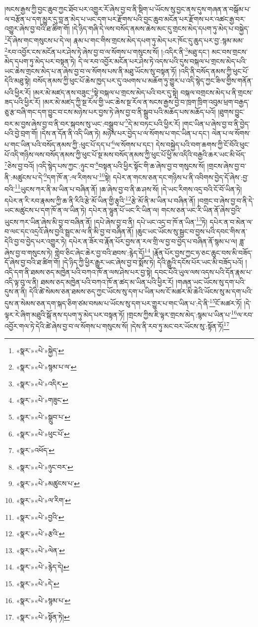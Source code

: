 །སངས་རྒྱས་ཀྱི་བྱང་ཆུབ་ཀྱང་ཐོབ་པར་འགྱུར་རོ་ཞེས་བྱ་བ་ནི་སྡིག་པ་ཡོངས་སུ་བྱང་ནས་དུས་གཞན་ན་བསྒོམ་པ་ལ་བརྩོན་པ་དག་མྱུར་དུ་བླ་ན་མེད་པ་ཡང་དག་པར་རྫོགས་པའི་བྱང་ཆུབ་མངོན་པར་རྫོགས་པར་འཚང་རྒྱ་བར་འགྱུར་ཞེས་བྱ་བའི་ཐ་ཚིག་གོ། །དེ་ཉིད་གཞི་དེ་ལས་བསོད་ནམས་ཆེས་མང་དུ་གྲངས་མེད་དཔག་ཏུ་མེད་པ་བསྐྱེད་\footnote{«སྣར་»«པེ་»སྐྱེད་}དོ་ཞེས་གང་གསུངས་པ་དེ་ལ། རྣམ་པ་གང་གིས་གྲངས་མེད་དཔག་ཏུ་མེད་པར་ཁོང་དུ་ཆུད་པར་བྱ་:སྙམ་མམ་\footnote{«སྣར་»«པེ་»སྙམ་པ་ལ་}རབ་འབྱོར་ངས་མངོན་པར་ཤེས་ཏེ་ཞེས་བྱ་བ་ལ་སོགས་པ་གསུངས་སོ། །:འདིར་ནི་\footnote{«སྣར་»«པེ་»འདིར་}མཐུ་དང་། མང་བས་གྲངས་མེད་དཔག་ཏུ་མེད་པར་བསྟན་ཏེ། དེ་ལ་རབ་འབྱོར་མངོན་པར་ཤེས་ཏེ་འདས་པའི་དུས་བསྐལ་པ་གྲངས་མེད་པའི་ཡང་ཆེས་གྲངས་མེད་པ་ན་ཞེས་བྱ་བ་ལ་སོགས་པས་ནི་མཐུ་ཡོངས་སུ་བསྟན་ཏོ། །འདི་ནི་བསོད་ནམས་ཀྱི་ཕུང་པོ་དེའི་མཐུ་སྟེ། བསོད་ནམས་ཀྱི་ཕུང་པོ་ཆེས་ཁྱད་པར་དུ་འཕགས་པ་མཆོག་ཏུ་གྱུར་པ་འདི་སྙེད་ཀྱང་ཟིལ་གྱིས་གནོན་པའི་ཕྱིར་རོ། །མར་མེ་མཛད་ནས་བཟུང་\footnote{«སྣར་»«པེ་»གཟུང་}སྟེ་བསྐལ་པ་གྲངས་མེད་པའི་བར་དུ་སྟེ། བསྐལ་བགྲངས་མེད་པ་ནི་གྲངས་ཟད་པའི་ཕྱིར་རོ། །མར་མེ་མཛད་ཀྱི་སྔ་རོལ་གྱི་ཡང་ཆེས་སྔ་རོལ་ན་སངས་རྒྱས་བྱེ་བ་ཁྲག་ཁྲིག་འབུམ་ཕྲག་བརྒྱད་ཅུ་རྩ་བཞི་གང་དག་བྱུང་བ་ངས་མཉེས་པར་བྱས་ཏེ་ཞེས་བྱ་བ་ནི་སྒྲུབ་པའི་མཆོད་པས་མཆོད་པའོ། །ཐུགས་བྱུང་བར་མ་བྱས་ཞེས་བྱ་བ་ནི་བར་སྐབས་སུ་ཡང་:བསྒྲུབ་པ་\footnote{«སྣར་»«པེ་»སྒྲུབ་པ་}དེ་མ་བཏང་པའི་ཕྱིར་རོ། །གང་ཡིན་པ་ཞེས་བྱ་བ་ནི་བྱེད་པའི་བྱེ་བྲག་གོ། །དེས་ན་དོན་ནི་འདི་ཡིན་ཏེ། མཉེས་པར་བྱེད་པ་ལ་སོགས་པ་གང་ཡིན་པ་དང་། ལེན་པ་ལ་སོགས་པ་གང་ཡིན་པའི་བསོད་ནམས་ཀྱི་:ཕུང་པོ་དད་པ་\footnote{«སྣར་»«པེ་»ཕུང་པོ་}ལ་སོགས་པ་དང་། དེས་བསྐྱེད་པའི་བག་ཆགས་ཀྱི་ངོ་བོའི་ཕུང་པོ་འདི་གཉིས་ལས་བསོད་ནམས་ཀྱི་ཕུང་པོ་སྔ་མས་བསོད་ནམས་ཀྱི་ཕུང་པོ་ཕྱི་མ་འདིའི་བརྒྱའི་ཆར་ཡང་མི་ཕོད་\footnote{«སྣར་»འཕོད་}ཅེས་བྱ་བའོ། །འདི་སྙེད་པས་ཀྱང་:ཉུང་བ་\footnote{«སྣར་»«པེ་»ཉུང་བར་}བསྟན་པའི་ཕྱིར་སྟོང་གི་ཆ་ཞེས་བྱ་བ་གསུངས་སོ། །གྲངས་ཞེས་བྱ་བ་ནི་:མཚུངས་པ་དེ་\footnote{«སྣར་»«པེ་»མཚུངས་པ་}དག་ཁོ་ན་:ལ་རིགས་པ་\footnote{«སྣར་»«པེ་»ལ་རིག་}སྟེ། དཔེར་ན་གངས་ཅན་དང་གཉིས་པ་ནི་འབིགས་བྱེད་དོ་ཞེས་:བྱ་བའི་\footnote{«སྣར་»«པེ་»བྱའི་}ཡུངས་ཀར་ནི་མ་ཡིན་པ་བཞིན་ནོ། །ཆ་ཞེས་བྱ་བ་ནི་ཆ་ཤས་སོ། །དེ་ཡང་རིགས་འདྲ་བའི་ངོ་བོ་ཡིན་ཏེ། དཔེར་ན་རི་རབ་རྣམས་ཀྱི་ཆ་ནི་རིའི་རྩེ་མོ་ཡིན་གྱི་རྩྭའི་\footnote{«སྣར་»«པེ་»རྩའི་}རྩེ་མོ་ནི་མ་ཡིན་པ་བཞིན་ནོ། །བགྲང་བ་ཞེས་བྱ་བ་ནི་དེ་ཡང་མཚུངས་པ་དག་ཁོ་ན་ལ་ཡིན་ཏེ། དཔེར་ན་ལྷུན་པོ་ཡང་རི་ཡིན་ལ། གངས་ཅན་ཡང་རི་ཡིན་ནོ་ཞེས་བྱའི་ཡུངས་ཀར་ཡིན་ཞེས་མི་བྱ་བ་བཞིན་ནོ། །དཔེ་ཞེས་བྱ་བ་ནི། དཔེ་ཡང་འདྲ་བ་ཁོ་ན་ཡིན་\footnote{«སྣར་»«པེ་»ལེན་}ཏེ། དཔེར་ན་བ་མེན་ལ་བ་ལང་དང་འདྲའོ་ཞེས་བྱའི་སྦྲང་མ་ལ་ནི་མི་བྱ་བ་བཞིན་ནོ། །ཆུང་ཡང་ཡོངས་སུ་སྦྱང་བ་བྱས་པའི་དབང་གིས་ན་དེའི་བྱ་བ་བྱེད་པར་འགྱུར་ཏེ། དཔེར་ན་ཟོར་བ་རྣོན་པོར་བྱས་ན་རལ་གྲི་ལ་བྱ་བ་བྱེད་པ་བཞིན་ནོ་སྙམ་པ་ལ། ཟླ་ཞེས་བྱ་བ་གསུངས་ཏེ། གླེབ་ཅིང་ཞེང་ཆེར་བྱ་བའི་ཐབས་:རྙེད་དོ།\footnote{«སྣར་»«པེ་»རྙེད་དེ།} །རྣོན་པོར་བྱས་ཀྱང་ཧ་ཅང་ཆུང་བས་མི་བཟོད་དོ་ཞེས་བྱ་བའི་ཐ་ཚིག་གོ། །དེ་ཉིད་ཀྱི་ཕྱིར་རྒྱུར་ཡང་ཞེས་བྱ་བ་སྨོས་ཏེ། དེའི་རྒྱུའི་དངོས་པོར་ཡང་མི་བཟོད་པའོ། །འདི་དག་ནི་ཐམས་ཅད་མཁྱེན་པའི་བཀའ་ཁོ་ན་ལས་ཤེས་པར་བྱ་སྟེ། དབང་པོའི་ཡུལ་ལས་འདས་པའི་དོན་རྣམ་པ་འདི་ལྟ་བུ་ལ་ནི། ཐམས་ཅད་མཁྱེན་པའི་བཀའ་ཁོ་ན་ཚད་མ་ཡིན་པའི་ཕྱིར་རོ། །གཞན་ཡང་ཡོངས་སུ་དག་པའི་དུས་ན་ནི། དེའི་ཚེ་སེམས་ཅན་ཐམས་ཅད་ཀྱང་ཡོངས་སུ་དག་པ་ཡིན་པས་ངོ་མཚར་མི་ཆེའི་ཡོངས་སུ་མ་དག་པའི་དུས་ན་སེམས་ཅན་དག་སྐད་ཅིག་ཙམ་བསམ་པ་ཡོངས་སུ་དག་པར་གྱུར་པ་གང་ཡིན་པ་:དེ་ནི་\footnote{«སྣར་»«པེ་»དེ་}ངོ་མཚར་ཏོ། །དེ་ལྟར་རེ་ཞིག་མཐུའི་སྒོ་ནས་དཔག་ཏུ་མེད་པར་བསྟན་ཏོ། །གྲངས་ཀྱིས་ཇི་ལྟར་གྲངས་མེད་:སྙམ་པ་ཡིན་པ་\footnote{«སྣར་»«པེ་»སྙམ་པ་}ལ་རབ་འབྱོར་གལ་ཏེ་དེའི་ཚེ་ཞེས་བྱ་བ་ལ་སོགས་པ་གསུངས་སོ། །དེས་ནི་རབ་ཏུ་མང་བར་ཡོངས་སུ་:སྟོན་ཏོ།\footnote{«སྣར་»«པེ་»སྟོན་ཏེ།} 